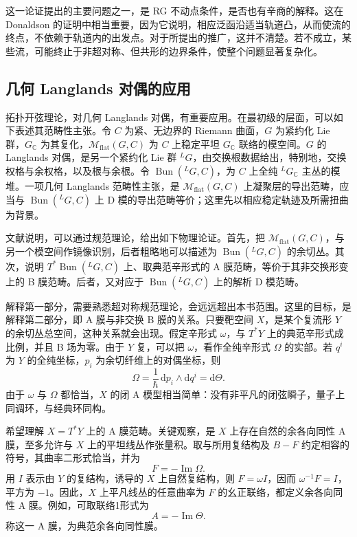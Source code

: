 这一论证提出的主要问题之一，是 RG 不动点条件，是否也有辛商的解释。这在 Donaldson 的证明中相当重要，因为它说明，相应泛函沿适当轨道凸，从而使流的终点，不依赖于轨道内的出发点。对于所提出的推广，这并不清楚。若不成立，某些流，可能终止于非超对称、但共形的边界条件，使整个问题显著复杂化。

\subsection{几何 Langlands 对偶的应用}\label{sec:5.9.4}

拓扑开弦理论，对几何 Langlands 对偶，有重要应用。在最初级的层面，可以如下表述其范畴性主张。令 $C$ 为紧、无边界的 Riemann 曲面，$G$ 为紧约化 Lie 群，$G_{\mathbb{C}}$ 为其复化，$\mathcal{M}_{\mathrm{flat}}(G,C)$ 为 $C$ 上稳定平坦 $G_{\mathbb{C}}$ 联络的模空间。$G$ 的 Langlands 对偶，是另一个紧约化 Lie 群 ${}^LG$，由交换根数据给出，特别地，交换权格与余权格，以及根与余根。令 $\operatorname{Bun}({}^LG,C)$，为 $C$ 上全纯 ${}^LG_{\mathbb C}$ 主丛的模堆。一项几何 Langlands 范畴性主张，是 $\mathcal{M}_{\mathrm{flat}}(G,C)$ 上凝聚层的导出范畴，应当与 $\operatorname{Bun}({}^LG,C)$ 上 D 模的导出范畴等价；这里先以相应稳定轨迹及所需扭曲为背景。

文献说明，可以通过规范理论，给出如下物理论证。首先，把 $\mathcal{M}_{\mathrm{flat}}(G,C)$，与另一个模空间作镜像识别，后者粗略地可以描述为 $\operatorname{Bun}({}^LG,C)$ 的余切丛。其次，说明 $T^*\operatorname{Bun}({}^LG,C)$ 上、取典范辛形式的 A 膜范畴，等价于其非交换形变上的 B 膜范畴。后者，又对应于 $\operatorname{Bun}({}^LG,C)$ 上的解析 D 模范畴。

解释第一部分，需要熟悉超对称规范理论，会远远超出本书范围。这里的目标，是解释第二部分，即 A 膜与非交换 B 膜的关系。只要靶空间 $X$，是某个复流形 $Y$ 的余切丛总空间，这种关系就会出现。假定辛形式 $\omega$，与 $T^*Y$ 上的典范辛形式成比例，并且 B 场为零。由于 $Y$ 复，可以把 $\omega$，看作全纯辛形式 $\Omega$ 的实部。若 $q^i$ 为 $Y$ 的全纯坐标，$p_i$ 为余切纤维上的对偶坐标，则
\[
\Omega=\frac1\hbar\,\mathrm{d}p_i\wedge\mathrm{d}q^i
=\mathrm{d}\Theta.
\]
由于 $\omega$ 与 $\Omega$ 都恰当，$X$ 的闭 A 模型相当简单：没有非平凡的闭弦瞬子，量子上同调环，与经典环同构。

希望理解 $X=T^*Y$ 上的 A 膜范畴。关键观察，是 $X$ 上存在自然的余各向同性 A 膜，至多允许与 $X$ 上的平坦线丛作张量积。取与所用复结构及 $B-F$ 约定相容的符号，其曲率二形式恰当，并为
\[
F=-\operatorname{Im}\Omega.
\]
用 $I$ 表示由 $Y$ 的复结构，诱导的 $X$ 上自然复结构，则 $F=\omega I$，因而 $\omega^{-1}F=I$，平方为 $-1$。因此，$X$ 上平凡线丛的任意曲率为 $F$ 的幺正联络，都定义余各向同性 A 膜。例如，可取联络1形式为
\[
A=-\operatorname{Im}\Theta.
\]
称这一 A 膜，为典范余各向同性膜。


